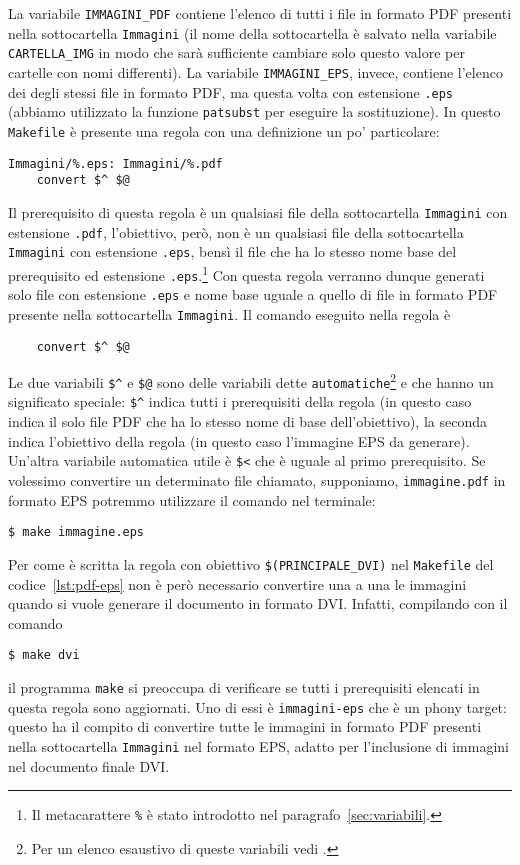 La variabile \texttt{IMMAGINI\_PDF} contiene l'elenco di tutti i file in formato
\textsc{PDF} presenti nella sottocartella \texttt{Immagini} (il nome della
sottocartella è salvato nella variabile \texttt{CARTELLA\_IMG} in modo che sarà
sufficiente cambiare solo questo valore per cartelle con nomi differenti).  La
variabile \texttt{IMMAGINI\_EPS}, invece, contiene l'elenco dei degli stessi
file in formato \textsc{PDF}, ma questa volta con estensione \texttt{.eps}
(abbiamo utilizzato la funzione \texttt{patsubst} per eseguire la sostituzione).
In questo \texttt{Makefile} è presente una regola con una definizione un po'
particolare:
\begin{lstlisting}
Immagini/%.eps: Immagini/%.pdf
	convert $^ $@
\end{lstlisting}
Il prerequisito di questa regola è un qualsiasi file della sottocartella
\texttt{Immagini} con estensione \texttt{.pdf}, l'obiettivo, però, non è un
qualsiasi file della sottocartella \texttt{Immagini} con estensione
\texttt{.eps}, bensì il file che ha lo stesso nome base del prerequisito ed
estensione
\texttt{.eps}.\footnote{Il metacarattere \texttt{\%} è stato introdotto nel
  paragrafo~\ref{sec:variabili}.}
Con questa regola verranno dunque generati solo file con estensione
\texttt{.eps} e nome base uguale a quello di file in formato \textsc{PDF}
presente nella sottocartella \texttt{Immagini}.  Il comando eseguito nella
regola è
\begin{lstlisting}
	convert $^ $@
\end{lstlisting}
Le due variabili \texttt{\$\^} e \texttt{\$@} sono delle variabili dette
\texttt{automatiche}\footnote{Per un elenco esaustivo di queste variabili vedi
  \textcite[112]{gnu:make}.}
e che hanno un significato speciale: \texttt{\$\^} indica tutti i prerequisiti
della regola (in questo caso indica il solo file \textsc{PDF} che ha lo stesso
nome di base dell'obiettivo), la seconda indica l'obiettivo della regola (in
questo caso l'immagine \textsc{EPS} da generare).  Un'altra variabile automatica
utile è \texttt{\$<} che è uguale al primo prerequisito.  Se volessimo
convertire un determinato file chiamato, supponiamo, \texttt{immagine.pdf} in
formato \textsc{EPS} potremmo utilizzare il comando nel terminale:
\begin{verbatim}
$ make immagine.eps
\end{verbatim} %
Per come è scritta la regola con obiettivo \texttt{\$(PRINCIPALE\_DVI)} nel
\texttt{Makefile} del codice~\ref{lst:pdf-eps} non è però necessario convertire
una a una le immagini quando si vuole generare il documento in formato
\textsc{DVI}.  Infatti, compilando con il comando
\begin{verbatim}
$ make dvi
\end{verbatim} %
il programma \texttt{make} si preoccupa di verificare se tutti i prerequisiti
elencati in questa regola sono aggiornati.  Uno di essi è \texttt{immagini-eps}
che è un phony target: questo ha il compito di convertire tutte le immagini in
formato \textsc{PDF} presenti nella sottocartella \texttt{Immagini} nel formato
\textsc{EPS}, adatto per l'inclusione di immagini nel documento finale
\textsc{DVI}.

